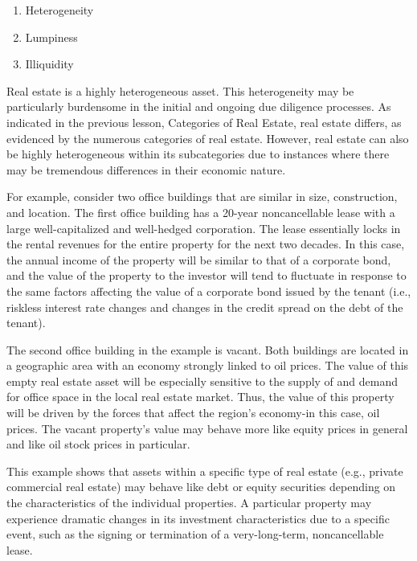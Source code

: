 \documentclass[11pt]{article}
\begin{document}
\begin{enumerate}
  \item Heterogeneity

  \item Lumpiness

  \item Illiquidity

\end{enumerate}

Real estate is a highly heterogeneous asset. This heterogeneity may be particularly burdensome in the initial and ongoing due diligence processes. As indicated in the previous lesson, Categories of Real Estate, real estate differs, as evidenced by the numerous categories of real estate. However, real estate can also be highly heterogeneous within its subcategories due to instances where there may be tremendous differences in their economic nature.

For example, consider two office buildings that are similar in size, construction, and location. The first office building has a 20-year noncancellable lease with a large well-capitalized and well-hedged corporation. The lease essentially locks in the rental revenues for the entire property for the next two decades. In this case, the annual income of the property will be similar to that of a corporate bond, and the value of the property to the investor will tend to fluctuate in response to the same factors affecting the value of a corporate bond issued by the tenant (i.e., riskless interest rate changes and changes in the credit spread on the debt of the tenant).

The second office building in the example is vacant. Both buildings are located in a geographic area with an economy strongly linked to oil prices. The value of this empty real estate asset will be especially sensitive to the supply of and demand for office space in the local real estate market. Thus, the value of this property will be driven by the forces that affect the region's economy-in this case, oil prices. The vacant property's value may behave more like equity prices in general and like oil stock prices in particular.

This example shows that assets within a specific type of real estate (e.g., private commercial real estate) may behave like debt or equity securities depending on the characteristics of the individual properties. A particular property may experience dramatic changes in its investment characteristics due to a specific event, such as the signing or termination of a very-long-term, noncancellable lease.
\end{document}
